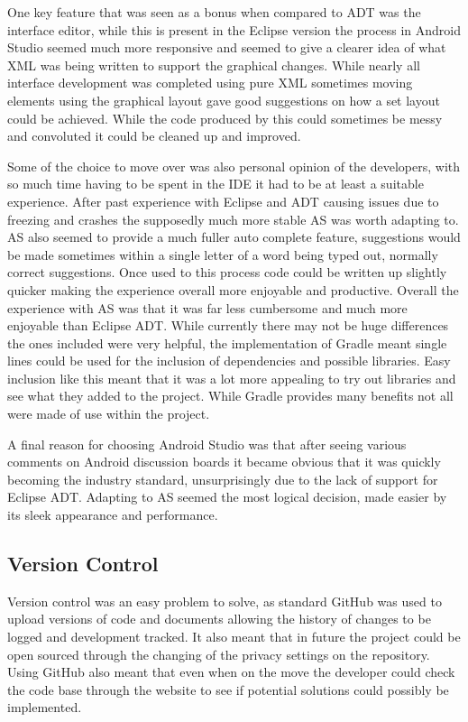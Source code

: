 One key feature that was seen as a bonus when compared to ADT was the interface editor, while this is present in the Eclipse version the process in Android Studio seemed much more responsive and seemed to give a clearer idea of what XML was being written to support the graphical changes. While nearly all interface development was completed using pure XML sometimes moving elements using the graphical layout gave good suggestions on how a set layout could be achieved. While the code produced by this could sometimes be messy and convoluted it could be cleaned up and improved. 

Some of the choice to move over was also personal opinion of the developers, with so much time having to be spent in the IDE it had to be at least a suitable experience. After past experience with Eclipse and ADT causing issues due to freezing and crashes the supposedly much more stable AS was worth adapting to. AS also seemed to provide a much fuller auto complete feature, suggestions would be made sometimes within a single letter of a word being typed out, normally correct suggestions. Once used to this process code could be written up slightly quicker making the experience overall more enjoyable and productive. Overall the experience with AS was that it was far less cumbersome and much more enjoyable than  Eclipse ADT. While currently there may not be huge differences the ones included were very helpful, the implementation of Gradle\cite{gradle} meant single lines could be used for the inclusion of dependencies and possible libraries. Easy inclusion like this meant that it was a lot more appealing to try out libraries and see what they added to the project. While Gradle provides many benefits not all were made of use within the project. 

A final reason for choosing Android Studio was that after seeing various comments on Android discussion boards it became obvious that it was quickly becoming the industry standard, unsurprisingly due to the lack of support for Eclipse ADT. Adapting to AS seemed the most logical decision, made easier by its sleek appearance and performance. 
\subsection{Version Control}
Version control was an easy problem to solve, as standard GitHub was used to upload versions of code and documents allowing the history of changes to be logged and development tracked. It also meant that in future the project could be open sourced through the changing of the privacy settings on the repository. Using GitHub also meant that even when on the move the developer could check the code base through the website to see if potential solutions could possibly be implemented. 


